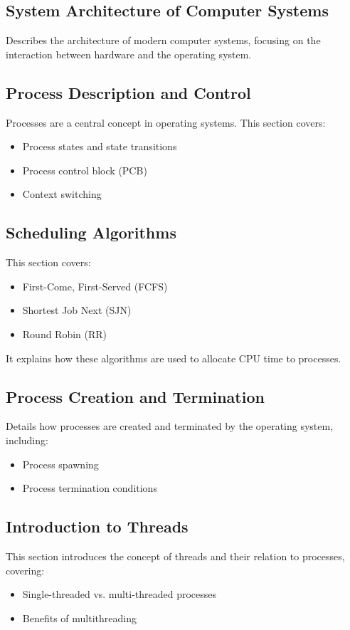 \documentclass[12pt]{article}
\begin{document}
\subsection{System Architecture of Computer Systems}
Describes the architecture of modern computer systems, focusing on the interaction between hardware and the operating system.

\subsection{Process Description and Control}
Processes are a central concept in operating systems. This section covers:
\begin{itemize}
    \item Process states and state transitions
    \item Process control block (PCB)
    \item Context switching
\end{itemize}

\subsection{Scheduling Algorithms}
This section covers:
\begin{itemize}
    \item First-Come, First-Served (FCFS)
    \item Shortest Job Next (SJN)
    \item Round Robin (RR)
\end{itemize}
It explains how these algorithms are used to allocate CPU time to processes.

\subsection{Process Creation and Termination}
Details how processes are created and terminated by the operating system, including:
\begin{itemize}
    \item Process spawning
    \item Process termination conditions
\end{itemize}

\subsection{Introduction to Threads}
This section introduces the concept of threads and their relation to processes, covering:
\begin{itemize}
    \item Single-threaded vs. multi-threaded processes
    \item Benefits of multithreading
\end{itemize}
\end{document}
